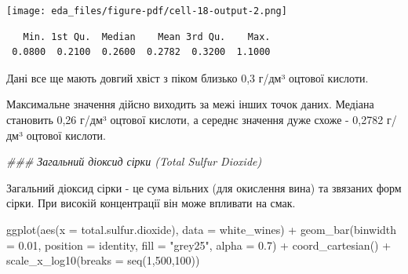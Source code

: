 \documentclass[
  letterpaper,
  DIV=11,
  numbers=noendperiod]{scrreprt}
\newenvironment{Shaded}{\begin{snugshade}}{\end{snugshade}}
\newcommand{\AttributeTok}[1]{\textcolor[rgb]{0.40,0.45,0.13}{#1}}
\newcommand{\DecValTok}[1]{\textcolor[rgb]{0.68,0.00,0.00}{#1}}
\newcommand{\DocumentationTok}[1]{\textcolor[rgb]{0.37,0.37,0.37}{\textit{#1}}}
\newcommand{\FloatTok}[1]{\textcolor[rgb]{0.68,0.00,0.00}{#1}}
\newcommand{\FunctionTok}[1]{\textcolor[rgb]{0.28,0.35,0.67}{#1}}
\newcommand{\NormalTok}[1]{\textcolor[rgb]{0.00,0.23,0.31}{#1}}
\newcommand{\SpecialCharTok}[1]{\textcolor[rgb]{0.37,0.37,0.37}{#1}}
\newcommand{\StringTok}[1]{\textcolor[rgb]{0.13,0.47,0.30}{#1}}
\begin{document}
\texttt{[image: eda\_files/figure-pdf/cell-18-output-2.png]}

\begin{Shaded}
\end{Shaded}

\begin{verbatim}
   Min. 1st Qu.  Median    Mean 3rd Qu.    Max. 
 0.0800  0.2100  0.2600  0.2782  0.3200  1.1000 
\end{verbatim}

Дані все ще мають довгий хвіст з піком близько 0,3 г/дм³ оцтової
кислоти.

Максимальне значення дійсно виходить за межі інших точок даних. Медіана
становить 0,26 г/дм³ оцтової кислоти, а середнє значення дуже схоже -
0,2782 г/дм³ оцтової кислоти.

\begin{Shaded}
\begin{Highlighting}[]
\DocumentationTok{\#\#\# Загальний діоксид сірки (Total Sulfur Dioxide)}

\NormalTok{Загальний діоксид сірки }\SpecialCharTok{{-}}\NormalTok{ це сума вільних (для окислення вина) та зв}\StringTok{\textquotesingle{}язаних форм сірки. При високій концентрації він може впливати на смак.}
\end{Highlighting}
\end{Shaded}

\begin{Shaded}
\begin{Highlighting}[]
\FunctionTok{ggplot}\NormalTok{(}\FunctionTok{aes}\NormalTok{(}\AttributeTok{x =}\NormalTok{ total.sulfur.dioxide), }\AttributeTok{data =}\NormalTok{ white\_wines) }\SpecialCharTok{+}
  \FunctionTok{geom\_bar}\NormalTok{(}\AttributeTok{binwidth =} \FloatTok{0.01}\NormalTok{, }\AttributeTok{position =} \StringTok{\textquotesingle{}identity\textquotesingle{}}\NormalTok{, }\AttributeTok{fill =} \StringTok{"grey25"}\NormalTok{, }\AttributeTok{alpha =} \FloatTok{0.7}\NormalTok{) }\SpecialCharTok{+}
  \FunctionTok{coord\_cartesian}\NormalTok{() }\SpecialCharTok{+}
  \FunctionTok{scale\_x\_log10}\NormalTok{(}\AttributeTok{breaks =} \FunctionTok{seq}\NormalTok{(}\DecValTok{1}\NormalTok{,}\DecValTok{500}\NormalTok{,}\DecValTok{100}\NormalTok{))}
\end{Highlighting}
\end{Shaded}
\end{document}
